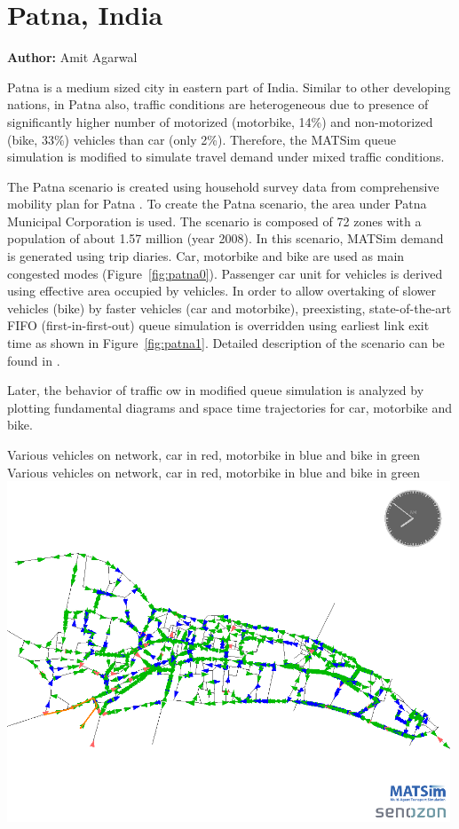 \section{Patna, India}
\label{ch:scenarios:patna}
\hfill \textbf{Author:} Amit Agarwal

Patna is a medium sized city in eastern part of India. Similar to other developing nations, in Patna also, traffic conditions are heterogeneous due to presence of significantly higher number of motorized (motorbike, 14\%) and non-motorized (bike, 33\%) vehicles than car (only 2\%). Therefore, the MATSim queue simulation is modified to simulate travel demand under mixed traffic conditions.

The Patna scenario is created using household survey data from comprehensive mobility plan for Patna \citep[][]{TrippItransVks2009PatnaReport}. To create the Patna scenario, the area under Patna Municipal Corporation is used. The scenario is composed of 72 zones with a population of about 1.57 million (year 2008). In this scenario, MATSim demand is generated using trip diaries. Car, motorbike and bike are used as main congested modes (Figure~\ref{fig:patna0}). Passenger car unit for vehicles is derived using effective area occupied by vehicles. In order to allow overtaking of slower vehicles (bike) by faster vehicles (car and motorbike), preexisting, state-of-the-art FIFO (first-in-first-out) queue simulation is overridden using earliest link exit time as shown in Figure~\ref{fig:patna1}. Detailed description of the scenario can be found in \citet[][]{AgarwalEtcMixedTraffic}.

Later, the behavior of traffic ow in modified queue simulation is analyzed by plotting fundamental diagrams and space time trajectories for car, motorbike and bike.

\createfigure%
{Various vehicles on network, car in red, motorbike in blue and bike in green}%
{Various vehicles on network, car in red, motorbike in blue and bike in green}%
{\label{fig:patna0}}%
{\includegraphics[width=0.99\textwidth, angle=0]{using/figures/vehiclesOnNetwork}}%
{}


